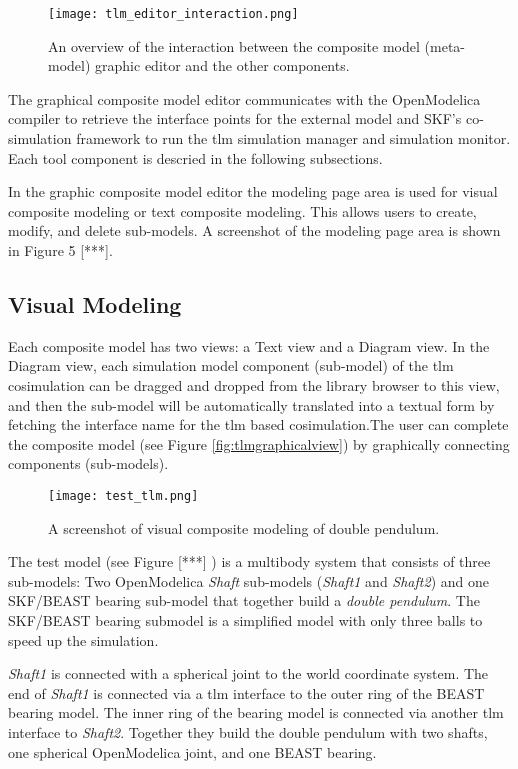 \begin{figure}
	\texttt{[image: tlm\_editor\_interaction.png]}
	\caption{An overview of the interaction between the composite model (meta-model) graphic editor and the other components.}
	\label{fig:tlmeditorinteraction}
\end{figure}

The graphical composite model editor communicates with the OpenModelica compiler to
retrieve the interface points for the external model and SKF’s co-simulation framework to run the \acrshort{tlm} simulation manager and simulation monitor. Each tool component is descried in the following subsections.

In the graphic composite model editor the modeling page area is used for visual composite modeling or text
composite modeling. This allows users to create, modify, and delete sub-models. A screenshot of the
modeling page area is shown in Figure 5 [***]. 

\subsection{Visual Modeling}
\label{sec:tlmvisual}

Each composite model has two views: a Text view and a Diagram view. In the Diagram view, each simulation
model component (sub-model) of the \acrshort{tlm} cosimulation can be dragged and dropped from the library browser to this view, and then the sub-model will be automatically translated into a textual form by
fetching the interface name for the \acrshort{tlm} based cosimulation.The user can complete the composite
model (see Figure \ref{fig:tlmgraphicalview}) by graphically connecting components (sub-models).

\begin{figure}
	\texttt{[image: test\_tlm.png]}
	\caption{A screenshot of visual composite modeling of double pendulum.}
	\label{fig:tlmtest}
\end{figure}

The test model (see Figure [***] ) is a multibody system that consists of three sub-models: Two OpenModelica
\textit{Shaft} sub-models (\textit{Shaft1} and \textit{Shaft2}) and one SKF/BEAST bearing sub-model that together build a \textit{double pendulum}. The SKF/BEAST bearing submodel is a simplified model with only three balls to speed up the simulation. 

\textit{Shaft1} is connected with a spherical joint to the world coordinate system. The end of \textit{Shaft1} is connected via a \acrshort{tlm} interface to the outer ring of the BEAST bearing model. The inner ring of the bearing model is connected via another \acrshort{tlm} interface to \textit{Shaft2}. Together they build the double pendulum with two shafts, one spherical OpenModelica joint, and one BEAST bearing. 

